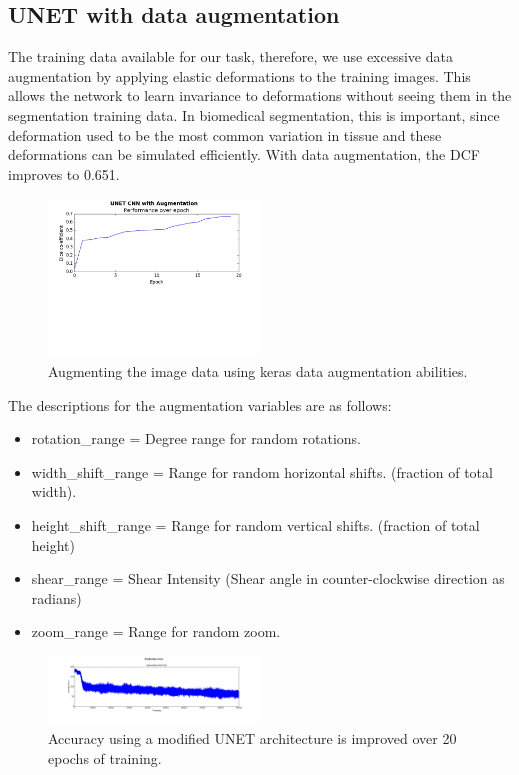 \documentclass[letterpaper]{article}
\begin{document}
\subsection{UNET with data augmentation}

The training data available for our task, therefore, we use excessive data augmentation by applying elastic deformations to the training images. This allows the network to learn invariance to deformations without seeing them in the segmentation training data. In biomedical segmentation, this is important, since deformation used to be the most common variation in tissue and these deformations can be simulated efficiently. With data augmentation, the DCF improves to 0.651.

 \begin{figure}[H]
  \centerline{\includegraphics[width=0.5\textwidth]{Plots/UNETSimple20Augmented.png}}
  \caption{Augmenting the image data using keras data augmentation abilities.}
  \label{fig:unet3}
\end{figure}

The descriptions for the augmentation variables are as follows:

\begin{itemize}
  \item rotation\_range = Degree range for random rotations.
  \item width\_shift\_range =  Range for random horizontal shifts. (fraction of total width). 
  \item height\_shift\_range = Range for random vertical shifts. (fraction of total height)
  \item shear\_range = Shear Intensity (Shear angle in counter-clockwise direction as radians)
  \item zoom\_range = Range for random zoom.
\end{itemize}


 \begin{figure}[H]
  \centerline{\includegraphics[width=0.5\textwidth]{Plots/AverageErrorKullEvery5000.png}}
  \caption{Accuracy using a modified UNET architecture is improved over 20 epochs of training.}
  \label{fig:trainingovertime2.}
\end{figure}
\end{document}
